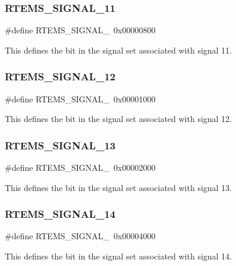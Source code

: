 \subsubsection{\texorpdfstring{RTEMS\_SIGNAL\_11}{RTEMS\_SIGNAL\_11}}
{\footnotesize\ttfamily \#define R\+T\+E\+M\+S\+\_\+\+S\+I\+G\+N\+A\+L\+\_~0x00000800}

This defines the bit in the signal set associated with signal 11. \mbox{\label{group__ClassicASR_ga27f53fcd28e430eacaf47515b9f731db}} 
\subsubsection{\texorpdfstring{RTEMS\_SIGNAL\_12}{RTEMS\_SIGNAL\_12}}
{\footnotesize\ttfamily \#define R\+T\+E\+M\+S\+\_\+\+S\+I\+G\+N\+A\+L\+\_~0x00001000}

This defines the bit in the signal set associated with signal 12. \mbox{\label{group__ClassicASR_ga0d864904f68da703fd550a3ed56fa30b}} 
\subsubsection{\texorpdfstring{RTEMS\_SIGNAL\_13}{RTEMS\_SIGNAL\_13}}
{\footnotesize\ttfamily \#define R\+T\+E\+M\+S\+\_\+\+S\+I\+G\+N\+A\+L\+\_~0x00002000}

This defines the bit in the signal set associated with signal 13. \mbox{\label{group__ClassicASR_ga45e55ff0f96c9ddd38affba02d8b339b}} 
\subsubsection{\texorpdfstring{RTEMS\_SIGNAL\_14}{RTEMS\_SIGNAL\_14}}
{\footnotesize\ttfamily \#define R\+T\+E\+M\+S\+\_\+\+S\+I\+G\+N\+A\+L\+\_~0x00004000}

This defines the bit in the signal set associated with signal 14. \mbox{\label{group__ClassicASR_ga401d09197c5a909133fa8ae79c3b8ec7}} 
